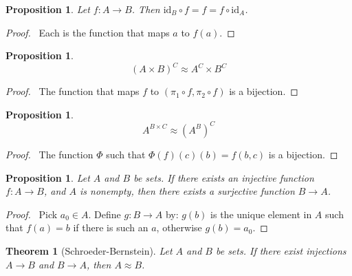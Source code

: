 \documentclass{book}
\let\qed\relax
\newtheorem{prop}[ax]{Proposition}
\newtheorem{thm}[ax]{Theorem}
\theoremstyle{definition}
\newcommand{\id}[1]{\ensuremath{\mathrm{id}_{#1}}}
\begin{document}
\begin{prop}
Let $f : A \rightarrow B$. Then $\id{B} \circ f = f = f \circ \id{A}$.
\end{prop}

\begin{proof}
\pf\ Each is the function that maps $a$ to $f(a)$. \qed
\end{proof}

\begin{prop}
\[ (A \times B)^C \approx A^C \times B^C \]
\end{prop}

\begin{proof}
\pf\ The function that maps $f$ to $(\pi_1 \circ f, \pi_2 \circ f)$ is a bijection. \qed
\end{proof}

\begin{prop}
\[ A^{B \times C} \approx (A^B)^C \]
\end{prop}

\begin{proof}
\pf\ The function $\Phi$ such that $\Phi(f)(c)(b) = f(b,c)$ is a bijection. \qed
\end{proof}

\begin{prop}
Let $A$ and $B$ be sets. If there exists an injective function $f : A \rightarrow B$, and $A$ is nonempty, then there exists a surjective function $B \rightarrow A$.
\end{prop}

\begin{proof}
\pf\ Pick $a_0 \in A$. Define $g : B \rightarrow A$ by: $g(b)$ is the unique element in $A$ such that $f(a) = b$ if there is such an $a$, otherwise $g(b) = a_0$. \qed
\end{proof}

\begin{thm}[Schroeder-Bernstein]
Let $A$ and $B$ be sets. If there exist injections $A \rightarrow B$ and $B \rightarrow A$, then $A \approx B$.
\end{thm}
\end{document}
